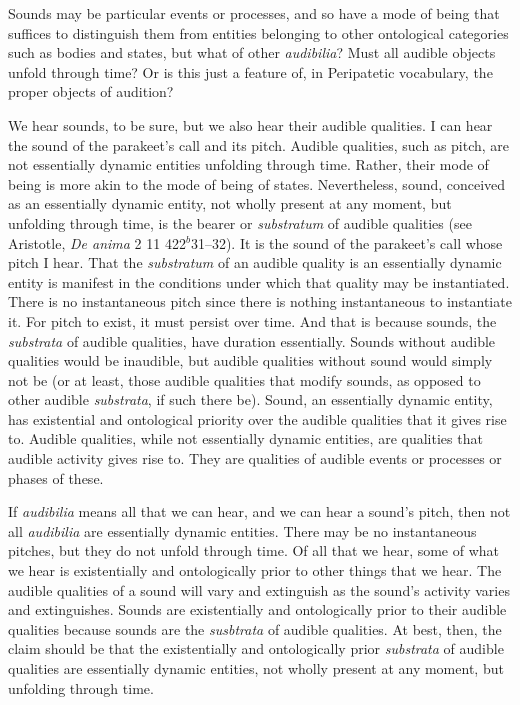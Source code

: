Sounds may be particular events or processes, and so have a mode of being that suffices to distinguish them from entities belonging to other ontological categories such as bodies and states, but what of other \emph{audibilia}? Must all audible objects unfold through time? Or is this just a feature of, in Peripatetic vocabulary, the proper objects of audition? 

We hear sounds, to be sure, but we also hear their audible qualities. I can hear the sound of the parakeet's call and its pitch. Audible qualities, such as pitch, are not essentially dynamic entities unfolding through time. Rather, their mode of being is more akin to the mode of being of states. Nevertheless, sound, conceived as an essentially dynamic entity, not wholly present at any moment, but unfolding through time, is the bearer or \emph{substratum} of audible qualities (see Aristotle, \emph{De anima} 2 11 422\( ^{b} \)31–32). It is the sound of the parakeet's call whose pitch I hear. That the \emph{substratum} of an audible quality is an essentially dynamic entity is manifest in the conditions under which that quality may be instantiated. There is no instantaneous pitch since there is nothing instantaneous to instantiate it. For pitch to exist, it must persist over time. And that is because sounds, the \emph{substrata} of audible qualities, have duration essentially. Sounds without audible qualities would be inaudible, but audible qualities without sound would simply not be (or at least, those audible qualities that modify sounds, as opposed to other audible \emph{substrata}, if such there be). Sound, an essentially dynamic entity, has existential and ontological priority over the audible qualities that it gives rise to. Audible qualities, while not essentially dynamic entities, are qualities that audible activity gives rise to. They are qualities of audible events or processes or phases of these.

If \emph{audibilia} means all that we can hear, and we can hear a sound's pitch, then not all \emph{audibilia} are essentially dynamic entities. There may be no instantaneous pitches, but they do not unfold through time. Of all that we hear, some of what we hear is existentially and ontologically prior to other things that we hear. The audible qualities of a sound will vary and extinguish as the sound's activity varies and extinguishes. Sounds are existentially and ontologically prior to their audible qualities because sounds are the \emph{susbtrata} of audible qualities. At best, then, the claim should be that the existentially and ontologically prior \emph{substrata} of audible qualities are essentially dynamic entities, not wholly present at any moment, but unfolding through time.

